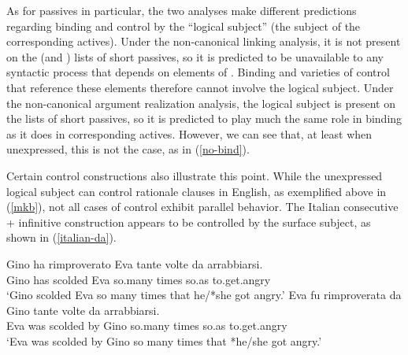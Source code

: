 \documentclass[output=paper
                ,modfonts
                ,nonflat
	        ,collection
	        ,collectionchapter
	        ,collectiontoclongg
 	        ,biblatex
                ,babelshorthands
                ,newtxmath
                ,draftmode
                ,colorlinks, citecolor=brown
]{./langsci/langscibook}
\begin{document}
As for passives in particular, the two analyses make different predictions regarding binding and control by the ``logical subject'' (the subject of the corresponding actives).
Under the non-canonical linking analysis, it is not present on the \argst (and \val) lists of short passives, so it is predicted to be unavailable to any syntactic process that depends on elements of \argst.
Binding and varieties of control that reference these elements therefore cannot involve the logical subject.
Under the non-canonical argument realization analysis, the logical subject is present on the \argst lists of short passives, so it is predicted to play much the same role in binding as it does in corresponding actives.
However, we can see that, at least when unexpressed, this is not the case, as in (\ref{no-bind}).
\begin{exe}
\end{exe}

Certain control constructions also illustrate this point.
While the unexpressed logical subject can control rationale clauses in English, as exemplified above in (\ref{mkb}), not all cases of control exhibit parallel behavior.
The Italian consecutive  + infinitive construction \citep{Perlmutter1984, Sanfilippo1998} appears to be controlled by the surface subject, as shown in (\ref{italian-da}).


\begin{exe}
\ex     \label{italian-da}
\begin{xlist}
\ex
\gll Gino ha  rimproverato Eva tante   volte da    arrabbiarsi.  \\
     Gino has scolded      Eva so.many times so.as to.get.angry  \\
\glt `Gino scolded Eva so many times that he/*she got angry.'
\ex
\gll Eva fu  rimproverata da Gino tante   volte da    arrabbiarsi.  \\
     Eva was scolded      by Gino so.many times so.as to.get.angry  \\
\glt `Eva was scolded by Gino so many times that *he/she got angry.'
\end{xlist}
\end{exe}
\end{document}
